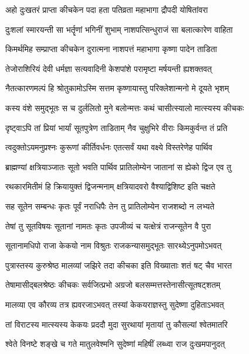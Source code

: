\twolineshloka
{अहो दुःखतरं प्राप्ता कीचकेन पदा हता}
{पतिव्रता महाभागा द्रौपदी योषितांवरा}


\twolineshloka
{दुःशलां स्मारयन्ती सा भर्तॄणां भगिनीं शुभाम्}
{नाशपत्सिन्धुराजं सा बलात्कारेण वाहिता}


\twolineshloka
{किमर्थमिह सम्प्राप्ता कीचकेन दुरात्मना}
{नाशपत्तं महाभागा कृष्णा पादेन ताडिता}


\twolineshloka
{तेजोराशिरियं देवी धर्मज्ञा सत्यवादिनी}
{केशपांशे परामृष्टा मर्षयन्ती ह्यशक्तवत्}


\twolineshloka
{नैतत्कारणमल्पं हि श्रोतुकामोऽस्मि सत्तम}
{कृष्णायास्तु परिक्लेशान्मनो मे दूयते भृशम्}


\twolineshloka
{कस्य वंशे समुद्भूतः स च दुर्ललितो मुने}
{बलोन्मत्तः कथं चासीत्स्यालो मात्स्यस्य कीचकः}


\twolineshloka
{दृष्ट्वाऽपि तां प्रियां भार्यां सूतपुत्रेण ताडिताम्}
{नैव चुक्षुभिरे वीराः किमकुर्वन्त तं प्रति}



\twolineshloka
{त्वदुक्तोऽयमनुप्रश्नः कुरूणां कीर्तिवर्धनः}
{एतत्सर्वं यथा वक्ष्ये विस्तरेणेह पार्थिव}


\twolineshloka
{ब्राह्मण्यां क्षत्रियाञ्जातः सूतो भवति पार्थिव}
{प्रातिलोम्येन जातानां स ह्येको द्विज एव तु}


\twolineshloka
{रथकारमितीमं हि क्रियायुक्तं द्विजन्मनाम्}
{क्षत्रियादवरो वैश्याद्विशिष्ट इति चक्षते}


\twolineshloka
{सह सूतेन सम्बन्धः कृतः पूर्वं नराधिपैः}
{तेन तु प्रातिलोम्येन राजशब्दो न लभ्यते}


\twolineshloka
{तेषां तु सूतविषयः सूतानां नामतः कृतः}
{उपजीव्यं च यत्क्षेत्रं राजन्सूतेन वै पुरा}


\twolineshloka
{सूतानामधिपो राजा केकयो नाम विश्रुतः}
{राजकन्यासमुद्भूतः सारथ्येऽनुपमोऽभवत्}


\twolineshloka
{पुत्रास्तस्य कुरुश्रेष्ठ मालव्यां जझिरे तदा}
{कीचका इति विख्याताः शतं षट् चैव भारत}


\twolineshloka
{तेषामासीद्बलश्रेष्ठः कीचकः सर्वजित्प्रभो}
{अग्रजो बलसम्मत्तस्तेनासीत्सूतषट्शतम्}


\twolineshloka
{मालव्या एव कौरव्य तत्र ह्यवरजाऽभवत्}
{तस्यां केकयराज्ञस्तु सुदेष्णा दुहिताऽभवत्}


\twolineshloka
{तां विराटस्य मात्स्यस्य केकयः प्रददौ मुदा}
{सुरथायां मृतायां तु कौसल्यां श्वेतमातरि}


\twolineshloka
{श्वेते विनष्टे शङ्खे च गते मातुलवेश्मनि}
{सुदेष्णां महिषीं लब्ध्वा राज दुःखमपानुदत्}


